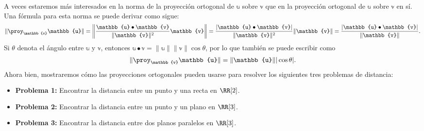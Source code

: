 A veces estaremos más interesados en la norma de la proyección ortogonal de $\mathbb{u}$ sobre $\mathbb{v}$ que en la proyección ortogonal de $\mathbb{u}$ sobre $\mathbb{v}$ en sí. Una fórmula para esta norma se puede derivar como sigue:
\begin{equation}
    \|\proy_{\mathbb{v}}\mathbb{u}\| = \left\| \frac{\mathbb{u} \bullet \mathbb{v}}{\|\mathbb{v}\|^2} \mathbb{v} \right\| = \frac{|\mathbb{u} \bullet \mathbb{v}|}{\|\mathbb{v}\|^2} \|\mathbb{v}\| = \frac{|\mathbb{u} \bullet \mathbb{v}|}{\|\mathbb{v}\|}. \label{eq:normaproyeccionvu}
\end{equation}
Si $\theta$ denota el ángulo entre $\mathbb{u}$ y $\mathbb{v}$, entonces $\mathbb{u} \bullet \mathbb{v} = \|\mathbb{u}\| \|\mathbb{v}\| \cos \theta$, por lo que también se puede escribir como
$$\|\proy_{\mathbb{v}}\mathbb{u}\| = \|\mathbb{u}\| |\cos \theta|.$$
Ahora bien, mostraremos cómo las proyecciones ortogonales pueden usarse para resolver los siguientes tres problemas de distancia:
\begin{itemize}
    \item \textbf{Problema 1:} Encontrar la distancia entre un punto y una recta en $\RR[2]$.
    \item \textbf{Problema 2:} Encontrar la distancia entre un punto y un plano en $\RR[3]$.
    \item \textbf{Problema 3:} Encontrar la distancia entre dos planos paralelos en $\RR[3]$.
\end{itemize}
